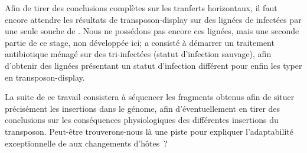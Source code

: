 Afin de tirer des conclusions complètes sur les tranferts horizontaux, il faut encore attendre les résultats de transposon-display sur des lignées de  infectées par une seule souche de .
Nous ne possédons pas encore ces lignées, mais une seconde partie de ce stage, non développée ici; a consisté à démarrer un traitement antibiotique ménagé sur des  tri-infectées (statut d'infection sauvage), afin d'obtenir des lignées présentant un statut d'infection différent pour enfin les typer en transposon-display.

La suite de ce travail consistera à séquencer les fragments obtenus afin de situer précisément les insertions dans le génome, afin d’éventuellement en tirer des conclusions sur les conséquences physiologiques des différentes insertions du transposon. Peut-être trouverons-nous là une piste pour expliquer l’adaptabilité exceptionnelle de  aux changements d’hôtes ?
